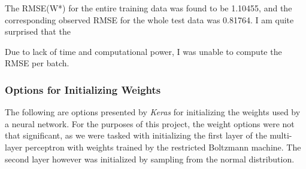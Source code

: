 \documentclass[11pt]{amsart}
\theoremstyle{remark}
\theoremstyle{remark}
\numberwithin{equation}{section}
\begin{document}
	The RMSE(W*) for the entire training data was found to be 1.10455, and the 
	corresponding observed RMSE for the whole test data was 0.81764. I am quite surprised that the 
	
	Due to lack of time and computational power, I was unable to compute the RMSE
	per batch. 
	
	
\subsubsection{Options for Initializing Weights}

	The following are options presented by \textit{Keras} for initializing the weights used 
	by a neural network.
	For the purposes of this project, the weight options were not that significant, as we were
	tasked with initializing the first layer of the multi-layer perceptron with weights trained 
	by the restricted	Boltzmann machine. The second layer however was initialized by 
	sampling from the normal distribution.
	
\end{document}
